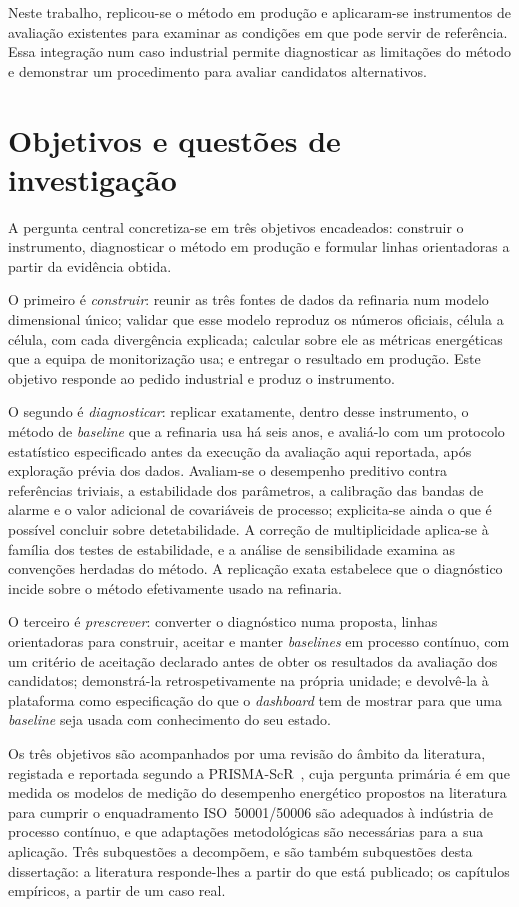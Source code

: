 Neste trabalho, replicou-se o método em produção e aplicaram-se
instrumentos de avaliação existentes para examinar as condições em que
pode servir de referência. Essa integração num caso industrial permite
diagnosticar as limitações do método e demonstrar um procedimento para
avaliar candidatos alternativos.

\section{Objetivos e questões de investigação}
\label{sec:objetivos}

A pergunta central concretiza-se em três objetivos encadeados:
construir o instrumento, diagnosticar o método em produção e formular
linhas orientadoras a partir da evidência obtida.

O primeiro é \emph{construir}: reunir as três fontes de dados da
refinaria num modelo dimensional único; validar que esse modelo
reproduz os números oficiais, célula a célula, com cada divergência
explicada; calcular sobre ele as métricas energéticas que a equipa de
monitorização usa; e entregar o resultado em produção. Este objetivo
responde ao pedido industrial e produz o instrumento.

O segundo é \emph{diagnosticar}: replicar exatamente, dentro desse
instrumento, o método de \emph{baseline} que a refinaria usa há seis
anos, e avaliá-lo com um protocolo estatístico especificado
antes da execução da avaliação aqui reportada, após exploração prévia
dos dados. Avaliam-se o desempenho preditivo contra referências triviais,
a estabilidade dos parâmetros, a calibração das bandas de alarme e o
valor adicional de covariáveis de processo; explicita-se ainda o que é
possível concluir sobre detetabilidade. A correção de multiplicidade
aplica-se à família dos testes de estabilidade, e a análise de
sensibilidade examina as convenções herdadas do método. A replicação exata estabelece que o diagnóstico incide
sobre o método efetivamente usado na refinaria.

O terceiro é \emph{prescrever}: converter o diagnóstico numa proposta,
linhas orientadoras para construir, aceitar e manter \emph{baselines}
em processo contínuo, com um critério de aceitação declarado
antes de obter os resultados da avaliação dos candidatos;
demonstrá-la retrospetivamente na própria unidade; e devolvê-la à plataforma
como especificação do que o \emph{dashboard} tem de mostrar para que uma
\emph{baseline} seja usada com conhecimento do seu estado.

Os três objetivos são acompanhados por uma revisão do
âmbito da literatura, registada e reportada segundo a
PRISMA-ScR~\cite{Tricco2018}, cuja pergunta primária é em que medida os
modelos de medição do desempenho energético propostos na literatura para
cumprir o enquadramento ISO~50001/50006 são adequados à indústria de
processo contínuo, e que adaptações metodológicas são necessárias para a
sua aplicação. Três subquestões a decompõem, e são também subquestões
desta dissertação: a literatura responde-lhes a partir do que está
publicado; os capítulos empíricos, a partir de um caso real.

